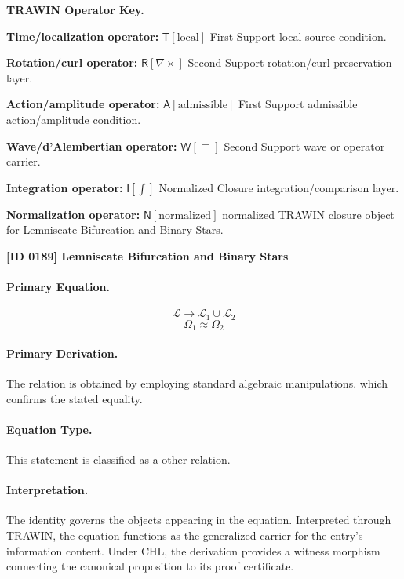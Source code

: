 \par\vspace{0.45\baselineskip}
\noindent\begin{minipage}[t]{\linewidth}
\begingroup
\small
\raggedright
\textbf{TRAWIN Operator Key.}\par
\noindent\textbf{Time/localization operator:} $\mathsf{T}\!\left[\mathrm{local}\right]$ First Support local source condition.\par
\noindent\textbf{Rotation/curl operator:} $\mathsf{R}\!\left[\nabla\times\right]$ Second Support rotation/curl preservation layer.\par
\noindent\textbf{Action/amplitude operator:} $\mathsf{A}\!\left[\mathrm{admissible}\right]$ First Support admissible action/amplitude condition.\par
\noindent\textbf{Wave/d'Alembertian operator:} $\mathsf{W}\!\left[\Box\right]$ Second Support wave or operator carrier.\par
\noindent\textbf{Integration operator:} $\mathsf{I}\!\left[\int\right]$ Normalized Closure integration/comparison layer.\par
\noindent\textbf{Normalization operator:} $\mathsf{N}\!\left[\mathrm{normalized}\right]$ normalized TRAWIN closure object for Lemniscate Bifurcation and Binary Stars.\par
\endgroup
\end{minipage}

\clearpage
\noindent\textbf{[ID 0189] Lemniscate Bifurcation and Binary Stars}\par
\vspace{0.35em}
\paragraph{Primary Equation.}
\[
\mathcal{L} \rightarrow \mathcal{L}_1 \cup \mathcal{L}_2
\]
\[
\Omega_1 \approx \Omega_2
\]

\paragraph{Primary Derivation.}
The relation is obtained by employing standard algebraic manipulations. which confirms the stated equality.
\paragraph{Equation Type.}
This statement is classified as a other relation.

\paragraph{Interpretation.}
The identity governs the objects appearing in the equation. Interpreted through TRAWIN, the equation functions as the generalized carrier for the entry’s information content. Under CHL, the derivation provides a witness morphism connecting the canonical proposition to its proof certificate.

